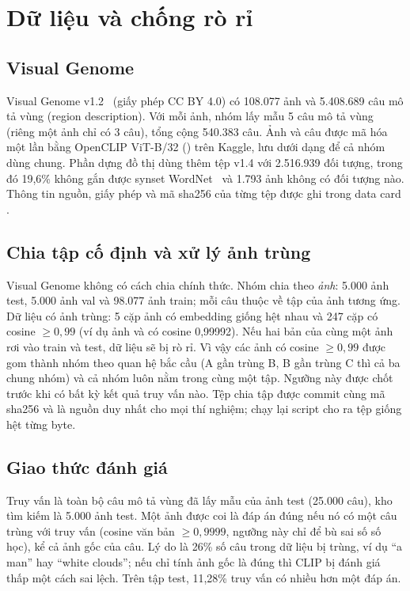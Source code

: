 \section{Dữ liệu và chống rò rỉ}
\label{sec:data}

\subsection{Visual Genome}
Visual Genome v1.2~\cite{krishna2017vg} (giấy phép CC BY 4.0) có 108.077 ảnh và 5.408.689 câu mô tả vùng (region description). Với mỗi ảnh, nhóm lấy mẫu 5 câu mô tả vùng (riêng một ảnh chỉ có 3 câu), tổng cộng 540.383 câu. Ảnh và câu được mã hóa một lần bằng OpenCLIP ViT-B/32 () trên Kaggle, lưu dưới dạng  để cả nhóm dùng chung. Phần dựng đồ thị dùng thêm tệp  v1.4 với 2.516.939 đối tượng, trong đó 19,6\% không gắn được synset WordNet~\cite{miller1995wordnet} và 1.793 ảnh không có đối tượng nào. Thông tin nguồn, giấy phép và mã sha256 của từng tệp được ghi trong data card .

\subsection{Chia tập cố định và xử lý ảnh trùng}
Visual Genome không có cách chia chính thức. Nhóm chia theo \emph{ảnh}: 5.000 ảnh test, 5.000 ảnh val và 98.077 ảnh train; mỗi câu thuộc về tập của ảnh tương ứng. Dữ liệu có ảnh trùng: 5 cặp ảnh có embedding giống hệt nhau và 247 cặp có cosine $\ge 0,99$ (ví dụ ảnh  và  có cosine 0,99992). Nếu hai bản của cùng một ảnh rơi vào train và test, dữ liệu sẽ bị rò rỉ. Vì vậy các ảnh có cosine $\ge 0,99$ được gom thành nhóm theo quan hệ bắc cầu (A gần trùng B, B gần trùng C thì cả ba chung nhóm) và cả nhóm luôn nằm trong cùng một tập. Ngưỡng này được chốt trước khi có bất kỳ kết quả truy vấn nào. Tệp chia tập  được commit cùng mã sha256 và là nguồn duy nhất cho mọi thí nghiệm; chạy lại script cho ra tệp giống hệt từng byte.

\subsection{Giao thức đánh giá}
\label{sec:protocol}
Truy vấn là toàn bộ câu mô tả vùng đã lấy mẫu của ảnh test (25.000 câu), kho tìm kiếm là 5.000 ảnh test. Một ảnh được coi là đáp án đúng nếu nó có một câu trùng với truy vấn (cosine văn bản $\ge 0,9999$, ngưỡng này chỉ để bù sai số số học), kể cả ảnh gốc của câu. Lý do là 26\% số câu trong dữ liệu bị trùng, ví dụ ``a man'' hay ``white clouds''; nếu chỉ tính ảnh gốc là đúng thì CLIP bị đánh giá thấp một cách sai lệch. Trên tập test, 11,28\% truy vấn có nhiều hơn một đáp án.


